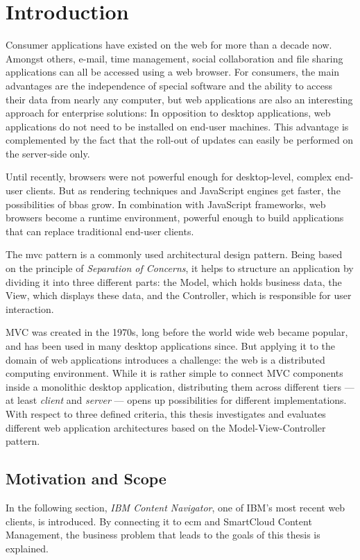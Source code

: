 

\chapter{Introduction}
\label{chap:introduction}
\setcounter{page}{1}
Consumer applications have existed on the web for more than a decade now. Amongst others, e-mail, time management, social collaboration and file sharing applications can all be accessed using a web browser. For consumers, the main advantages are the independence of special software and the ability to access their data from nearly any computer, but web applications are also an interesting approach for enterprise solutions: In opposition to desktop applications, web applications do not need to be installed on end-user machines. This advantage is complemented by the fact that the roll-out of updates can easily be performed on the server-side only.

Until recently, browsers were not powerful enough for desktop-level, complex end-user clients. But as rendering techniques and JavaScript engines get faster, the possibilities of \glspl{bba} grow. In combination with JavaScript frameworks, web browsers become a runtime environment, powerful enough to build applications that can replace traditional end-user clients.

The \acl{mvc} pattern is a commonly used architectural design pattern. Being based on the principle of \emph{Separation of Concerns}, it helps to structure an application by dividing it into three different parts: the Model, which holds business data, the View, which displays these data, and the Controller, which is responsible for user interaction.

MVC was created in the 1970s, long before the world wide web became popular, and has been used in many desktop applications since. But applying it to the domain of web applications introduces a challenge: the web is a distributed computing environment. While it is rather simple to connect MVC components inside a monolithic desktop application, distributing them across different tiers --- at least \emph{client} and \emph{server} --- opens up possibilities for different implementations. With respect to three defined criteria, this thesis investigates and evaluates different web application architectures based on the Model-View-Controller pattern.

\section{Motivation and Scope}
In the following section, \emph{IBM Content Navigator}, one of IBM's most recent web clients, is introduced. By connecting it to \acl{ecm} and SmartCloud Content Management, the business problem that leads to the goals of this thesis is explained.

